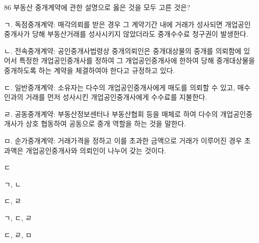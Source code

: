\begin{question}{86}
부동산 중개계약에 관한 설명으로 옳은 것을 모두 고른 것은?
\begin{framedtext}
ㄱ. 독점중개계약: 매각의뢰를 받은 경우 그 계약기간 내에 거래가 성사되면 개업공인중개사가 당해 부동산거래를 성사시키지 않았더라도 중개수수료 청구권이 발생한다. \par
ㄴ. 전속중개계약: 공인중개사법령상 중개의뢰인은 중개대상물의 중개를 의뢰함에 있어서 특정한 개업공인중개사를 정하여 그 개업공인중개사에 한하여 당해 중개대상물을 중개하도록 하는 계약을 체결하여야 한다고 규정하고 있다. \par
ㄷ. 일반중개계약: 소유자는 다수의 개업공인중개사에게 매도를 의뢰할 수 있고, 매수인과의 거래를 먼저 성사시킨 개업공인중개사에게 수수료를 지불한다. \par
ㄹ. 공동중개계약: 부동산정보센터나 부동산협회 등을 매체로 하여 다수의 개업공인중개사가 상호 협동하여 공동으로 중개 역할을 하는 것을 말한다. \par
ㅁ. 순가중개계약: 거래가격을 정하고 이를 초과한 금액으로 거래가 이루어진 경우 초과액은 개업공인중개사와 의뢰인이 나누어 갖는 것이다. \par
\end{framedtext}
\begin{choices}
  \item ㄷ
  \item ㄱ, ㄴ
  \item ㄷ, ㄹ
  \item ㄱ, ㄷ, ㄹ
  \item ㄷ, ㄹ, ㅁ
\end{choices}
\end{question}
